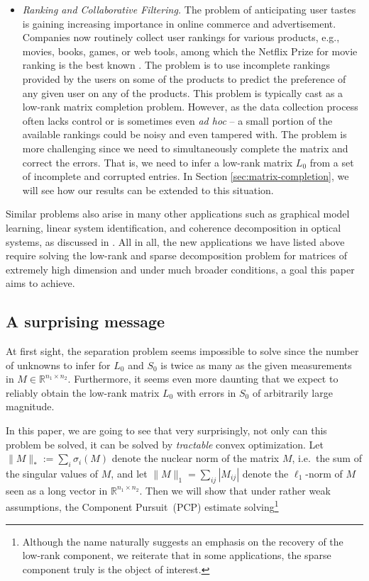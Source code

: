 \begin{itemize}
\item {\em Ranking and Collaborative Filtering.} The problem of anticipating user tastes is gaining increasing importance in online commerce and advertisement. Companies now routinely collect user rankings for various products, e.g., movies, books, games, or web tools, among which the Netflix Prize for movie ranking is the best known \cite{Netflix}. The problem is to use incomplete rankings provided by the users on some of the products to predict the preference of any given user on any of the products. This problem is typically cast as a low-rank matrix completion problem. However, as the data collection process often lacks control or is sometimes even
  {\it ad hoc} -- a small portion of the available rankings could be noisy and even tampered with. The problem is more challenging since we need to simultaneously complete the matrix and correct the errors.  That is, we need to infer a low-rank matrix $L_0$ from a set of incomplete and corrupted entries.  In Section
  \ref{sec:matrix-completion}, we will see how our results can be extended to this situation.
\end{itemize}

Similar problems also arise in many other applications such as graphical model learning, linear system identification, and coherence decomposition in optical systems, as discussed in \cite{Venkat-09}. All in all, the new applications we have listed above require solving the low-rank and sparse decomposition problem for matrices of extremely high dimension and under much broader conditions, a goal this paper aims to achieve.

\subsection{A surprising message} 
\label{sec:surprise}

At first sight, the separation problem seems impossible to solve since the number of unknowns to infer for $L_0$ and $S_0$ is twice as many as the given measurements in $M \in \mathbb{R}^{n_1\times n_2}$. Furthermore, it seems even more daunting that we expect to reliably obtain the low-rank matrix $L_0$ with errors in $S_0$ of arbitrarily large magnitude.

In this paper, we are going to see that very surprisingly, not only can this problem be solved, it can be solved by {\em tractable} convex optimization. Let $\|M\|_* := \sum_i \sigma_i(M)$ denote the nuclear norm of the matrix $M$, i.e.~the sum of the singular values of $M$, and let $\|M\|_1 = \sum_{ij} |M_{ij}|$ denote the $\ell_1$-norm of $M$ seen as a long vector in $\mathbb{R}^{n_1 \times n_2}$.  Then we will show that under rather weak assumptions, the {\emPrincipal Component Pursuit}\, (PCP) estimate
solving\footnote{Although the name naturally suggests an emphasis on the recovery of the low-rank component, we reiterate that in some applications, the sparse component truly is the object of interest.}

